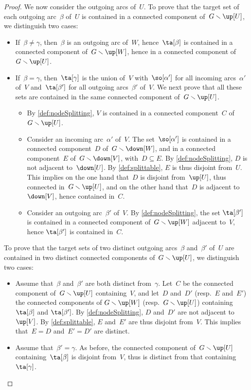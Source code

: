 \documentclass{amsart}
\theoremstyle{definition}
\newcommand{\ssm}{\smallsetminus} %
\begin{document}
\begin{proof}
  We now consider the outgoing arcs of~$U$.
  To prove that the target set of each outgoing arc~$\beta$ of~$U$ is contained in a connected component of~$G \ssm \up[U]$, we distinguish two cases:
  \begin{itemize}
    \item If~$\beta \ne \gamma$, then~$\beta$ is an outgoing arc of~$W$, hence~$\ta[\beta]$ is contained in a connected component of~$G \ssm \up[W]$, hence in a connected component of~$G \ssm \up[U]$.
    \item If~$\beta = \gamma$, then~$\ta[\gamma]$ is the union of~$V$ with~$\so[\alpha']$ for all incoming arcs~$\alpha'$ of~$V$ and~$\ta[\beta']$ for all outgoing arcs~$\beta'$ of~$V$. We next prove that all these sets are contained in the same connected component of~$G \ssm \up[U]$.
    \begin{itemize}
      \item By \cref{def:nodeSplitting}, $V$ is contained in a connected component~$C$ of~$G \ssm \up[U]$. 
      \item Consider an incoming arc~$\alpha'$ of~$V$. The set~$\so[\alpha']$ is contained in a connected component~$D$ of~$G \ssm \down[W]$, and in a connected component~$E$ of~$G \ssm \down[V]$, with~$D \subseteq E$. By \cref{def:nodeSplitting}, $D$ is not adjacent to~$\down[U]$. By \cref{def:splittable}, $E$ is thus disjoint from~$U$. This implies on the one hand that~$D$ is disjoint from~$\up[U]$, thus connected in~$G \ssm \up[U]$, and on the other hand that~$D$ is adjacent to~$\down[V]$, hence contained in~$C$. 
      \item Consider an outgoing arc~$\beta'$ of~$V$. By \cref{def:nodeSplitting}, the set $\ta[\beta']$ is contained in a connected component of~$G \ssm \up[W]$ adjacent to~$V$, hence $\ta[\beta']$ is contained in~$C$.
    \end{itemize}
  \end{itemize}
  To prove that the target sets of two distinct outgoing arcs~$\beta$ and~$\beta'$ of~$U$ are contained in two distinct connected components of~$G \ssm \up[U]$, we distinguish two cases:
  \begin{itemize}
  \item Assume that~$\beta$ and~$\beta'$ are both distinct from~$\gamma$. Let~$C$ be the connected component of~$G \ssm \up[U]$ containing~$V$, and let~$D$ and~$D'$ (resp.~$E$ and~$E'$) the connected components of $G \ssm \up[W]$ (resp.~$G \ssm \up[U]$) containing~$\ta[\beta]$ and $\ta[\beta']$. By \cref{def:nodeSplitting}, $D$ and~$D'$ are not adjacent to~$\up[V]$. By \cref{def:splittable}, $E$ and~$E'$ are thus disjoint from~$V$. This implies that~$E = D$ and~$E' = D'$ are distinct.
  \item Assume that~$\beta' = \gamma$. As before, the connected component of~$G \ssm \up[U]$ containing~$\ta[\beta]$ is disjoint from~$V$, thus is distinct from that containing~$\ta[\gamma]$.
  \qedhere
  \end{itemize}
\end{proof}
\end{document}
